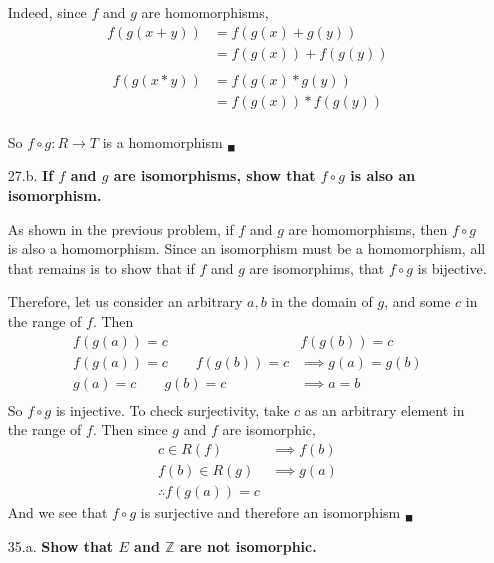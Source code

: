 \documentclass{article}
\begin{document}
\begin{enumerate}
			Indeed, since $f$ and $g$ are homomorphisms,
			\begin{align*}
				f(g(x + y)) & = f(g(x) + g(y)) \\ 
							& = f(g(x)) + f(g(y)) \\
			\end{align*}
			\begin{align*}
				f(g(x * y)) & = f(g(x) * g(y)) \\ 
							& = f(g(x)) * f(g(y)) \\
			\end{align*}

			So $f \circ g:R \rightarrow T$ is a homomorphism $_{\blacksquare}$

		\item [27.b.] \textbf{If $f$ and $g$ are isomorphisms, show that $f \circ g$ is also an 
							  isomorphism.}		

			As shown in the previous problem, if $f$ and $g$ are homomorphisms, then $f \circ g$ is
			also a homomorphism. Since an isomorphism must be a homomorphism, all that remains is 
			to show that if $f$ and $g$ are isomorphims, that $f \circ g$ is bijective.

			Therefore, let us consider an arbitrary $a, b$ in the domain of $g$, and some $c$ in the
			range of $f$. Then
			\begin{align*}
				f(g(a)) = c & f(g(b)) = c \\
				f(g(a)) = c \qquad f(g(b)) = c & \implies g(a) = g(b) \\
				g(a) = c \qquad g(b) = c & \implies a = b \\
			\end{align*} 
			So $f \circ g$ is injective. To check surjectivity, take $c$ as an arbitrary element in
			the range of $f$. Then since $g$ and $f$ are isomorphic, 
			\begin{align*}
				c \in R(f) & \implies f(b) \\
				f(b) \in R(g) & \implies g(a) \\
				\therefore f(g(a)) = c
			\end{align*}
			And we see that $f \circ g$ is surjective and therefore an isomorphism $_{\blacksquare}$

		\item [35.a.] \textbf{Show that $E$ and $\mathbb{Z}$ are not isomorphic.}


\end{enumerate}
\end{document}
